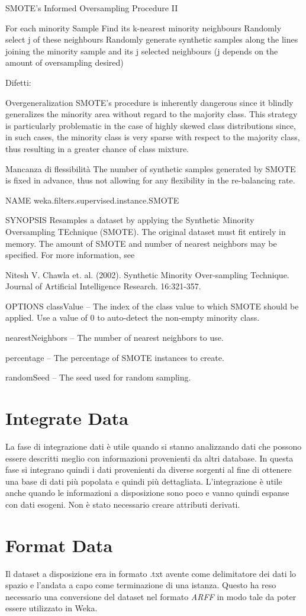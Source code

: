 SMOTE’s Informed Oversampling Procedure II

For each minority Sample
	Find its k-nearest minority neighbours
	Randomly select j of these neighbours
	Randomly generate synthetic samples along the lines joining the minority sample and its j selected neighbours
(j depends on the amount of oversampling desired) 


Difetti:

Overgeneralization
SMOTE’s procedure is inherently dangerous since it blindly generalizes the minority area without regard to the majority class.
This strategy is particularly problematic in the case of highly skewed class distributions since, in such cases, the minority class is very sparse with respect to the majority class, thus resulting in a greater chance of class mixture.

Mancanza di flessibilità
The number of synthetic samples generated by SMOTE is fixed in advance, thus not allowing for any flexibility in the re-balancing rate.

NAME
weka.filters.supervised.instance.SMOTE

SYNOPSIS
Resamples a dataset by applying the Synthetic Minority Oversampling TEchnique (SMOTE). The original dataset must fit entirely in memory. The amount of SMOTE and number of nearest neighbors may be specified. For more information, see 

Nitesh V. Chawla et. al. (2002). Synthetic Minority Over-sampling Technique. Journal of Artificial Intelligence Research. 16:321-357.

OPTIONS
classValue -- The index of the class value to which SMOTE should be applied. Use a value of 0 to auto-detect the non-empty minority class.

nearestNeighbors -- The number of nearest neighbors to use.

percentage -- The percentage of SMOTE instances to create.

randomSeed -- The seed used for random sampling.

\section{Integrate Data}
La fase di integrazione dati è utile quando si stanno analizzando dati che possono essere descritti meglio con informazioni provenienti da altri database. In questa fase si integrano quindi i dati provenienti da diverse sorgenti al fine di ottenere una base di dati più popolata e quindi più dettagliata. L'integrazione è utile anche quando le informazioni a disposizione sono poco e vanno quindi espanse con dati esogeni.
Non è stato necessario creare attributi derivati.

\section{Format Data}
Il dataset a disposizione era in formato .txt avente come delimitatore dei dati lo spazio e l'andata a capo come terminazione di una istanza. Questo ha reso necessario una conversione del dataset nel formato \textit{ARFF} in modo tale da poter essere utilizzato in Weka.
